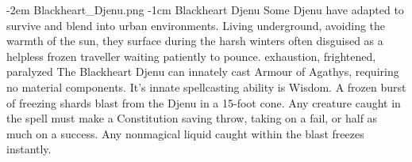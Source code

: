 \vfill\eject

\MonsterVariant%
	{-2em}%
	{Blackheart_Djenu.png}%
	{-1cm}
	{Blackheart Djenu}%
	{%
		Some Djenu have adapted to survive and blend into urban environments. Living underground, avoiding the warmth of the sun, they surface during the harsh winters often disguised as a helpless frozen traveller waiting patiently to pounce.
		exhaustion, frightened, paralyzed
		The Blackheart Djenu can innately cast Armour of Agathys, requiring  no material components. It's innate spellcasting ability is Wisdom.
		A frozen burst of freezing shards blast from the Djenu in a 15-foot cone. Any creature caught in the spell must make a Constitution saving throw, taking  on a fail, or half as much on a success. Any nonmagical liquid caught within the blast freezes instantly.
	}%
%
\vspace*{-2em}
